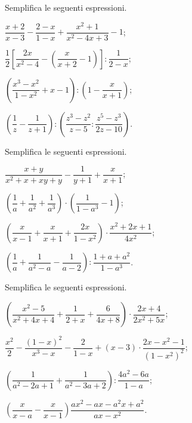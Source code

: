\begin{esercizio}[\Ast]
Semplifica le seguenti espressioni.
\begin{multicols}{2}
\begin{enumeratea}
 \item $\dfrac{x+2}{x-3}-\dfrac{2-x}{1-x}+\dfrac{x^{2}+1}{x^{2}-4x+3}-1$;
 \item $\dfrac{1}{2}\left[\dfrac{2x}{x^{2}-4}-\left(\dfrac{x}{x+2}-1\right)\right]:\dfrac{1}{2-x}$;
 \item $\left(\dfrac{x^{3}-x^{2}}{1-x^{2}}+x-1\right):\left(1-\dfrac{x}{x+1}\right)$;
 \item $\left(\dfrac{1}{z}-\dfrac{1}{z+1}\right):\left(\dfrac{z^{3}-z^{2}}{z-5}:\dfrac{z^{5}-z^{3}}{2z-10}\right)$.
\end{enumeratea}
\end{multicols}
\end{esercizio}

\begin{esercizio}[\Ast]
Semplifica le seguenti espressioni.
\begin{multicols}{2}
\begin{enumeratea}
 \item $\dfrac{x+y}{x^{2}+x+xy+y}-\dfrac{1}{y+1}+\dfrac{x}{x+1}$;
 \item $\left(\dfrac{1}{a}+\dfrac{1}{a^{2}}+\dfrac{1}{a^{3}}\right)\cdot \left(\dfrac{1}{1-a^{3}}-1\right)$;
 \item $\left(\dfrac{x}{x-1}+\dfrac{x}{x+1}+\dfrac{2x}{1-x^{2}}\right)\cdot {\dfrac{x^{2}+2x+1}{4x^{2}}}$;
 \item $\left(\dfrac{1}{a}+\dfrac{1}{a^{{2}}-a}-\dfrac{1}{a-2}\right):\dfrac{1+a+a^{2}}{1-a^{3}}$.
\end{enumeratea}
\end{multicols}
\end{esercizio}

\begin{esercizio}[\Ast]
Semplifica le seguenti espressioni.
\begin{enumeratea}
 \item $\left(\dfrac{x^{2}-5}{x^{2}+4x+4}+\dfrac{1}{2+x}+\dfrac{6}{4x+8}\right)\cdot {\dfrac{2x+4}{2x^{2}+5x}}$;
 \item $\dfrac{x^{2}}{2}-\dfrac{(1-x)^{2}}{x^{3}-x}-\dfrac{2}{1-x}+(x-3)\cdot {\dfrac{2x-x^{2}-1}{(1-x^{2})^{2}}}$;
 \item $\left(\dfrac{1}{a^{2}-2a+1}+\dfrac{1}{a^{2}-3a+2}\right):\dfrac{4a^{2}-6a}{1-a}$;
 \item $\left(\dfrac{x}{x-a}-\dfrac{x}{x-1}\right)\dfrac{ax^{2}-ax-a^{2}x+a^{2}}{ax-x^{2}}$.
\end{enumeratea}
\end{esercizio}

